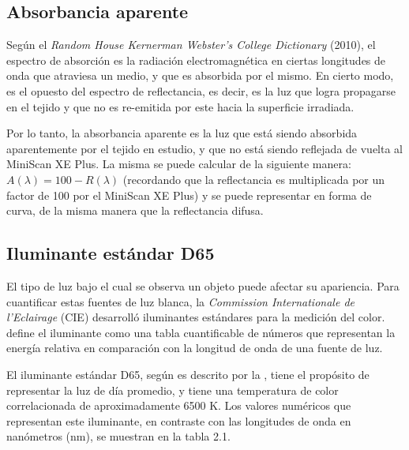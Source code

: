 	\subsection{Absorbancia aparente}
	
	Seg\'{u}n el \textit{Random House Kernerman Webster's College Dictionary} (2010), el espectro de absorci\'{o}n es la radiaci\'{o}n electromagn\'{e}tica en ciertas longitudes de onda que atraviesa un medio, y que es absorbida por el mismo. En cierto modo, es el opuesto del espectro de reflectancia, es decir, es la luz que logra propagarse en el tejido y que no es re-emitida por este hacia la superficie irradiada. 
	
	Por lo tanto, la absorbancia aparente es la luz que est\'{a} siendo absorbida aparentemente por el tejido en estudio, y que no est\'{a} siendo reflejada de vuelta al MiniScan XE Plus. La misma se puede calcular de la siguiente manera: $A(\lambda) = 100 - R(\lambda)$ (recordando que la reflectancia es multiplicada por un factor de 100 por el MiniScan XE Plus) y se puede representar en forma de curva, de la misma manera que la reflectancia difusa.

	\subsection{Iluminante est\'{a}ndar D65}
		
		El tipo de luz bajo el cual se observa un objeto puede afectar su apariencia. Para cuantificar estas fuentes de luz blanca, la \textit{Commission Internationale de l'Eclairage} (CIE) desarroll\'{o} iluminantes est\'{a}ndares para la medici\'{o}n del color.
		\cite{HunterLab} define el iluminante como una tabla cuantificable de n\'{u}meros que representan la energ\'{i}a relativa en comparaci\'{o}n con la longitud de onda de una fuente de luz. 
		
		El iluminante est\'{a}ndar D65, seg\'{u}n es descrito por la \cite{CIE}, tiene el prop\'{o}sito de representar la luz de d\'{i}a promedio, y tiene una temperatura de color correlacionada de aproximadamente 6500 K\degree. Los valores num\'{e}ricos que representan este iluminante, en contraste con las longitudes de onda en nan\'{o}metros (nm), se muestran en la tabla 2.1.
	
